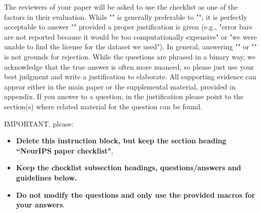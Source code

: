 \documentclass{article}
\begin{document}
The reviewers of your paper will be asked to use the checklist as one of the factors in their evaluation. While "\answerYes{}" is generally preferable to "\answerNo{}", it is perfectly acceptable to answer "\answerNo{}" provided a proper justification is given (e.g., "error bars are not reported because it would be too computationally expensive" or "we were unable to find the license for the dataset we used"). In general, answering "\answerNo{}" or "\answerNA{}" is not grounds for rejection. While the questions are phrased in a binary way, we acknowledge that the true answer is often more nuanced, so please just use your best judgment and write a justification to elaborate. All supporting evidence can appear either in the main paper or the supplemental material, provided in appendix. If you answer \answerYes{} to a question, in the justification please point to the section(s) where related material for the question can be found.

IMPORTANT, please:
\begin{itemize}
    \item {\bf Delete this instruction block, but keep the section heading ``NeurIPS paper checklist"},
    \item  {\bf Keep the checklist subsection headings, questions/answers and guidelines below.}
    \item {\bf Do not modify the questions and only use the provided macros for your answers}.
\end{itemize} 
 

\end{document}
